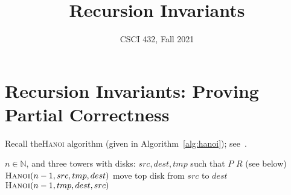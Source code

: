 \documentclass{article}
\title{Recursion Invariants}
\author{CSCI 432, Fall 2021}
\def\N{{\mathbb N}}
\newcommand{\algref}[1]{Algorithm~\ref{alg:#1}}
\begin{document}
\maketitle

\section*{Recursion Invariants: Proving Partial Correctness}

Recall the\textsc{Hanoi} algorithm (given in \algref{hanoi});
see~\cite[Ch.~1]{textbook}.

\begin{algorithm}[h!]
    \caption{$\textsc{Hanoi}(n,src,dest,tmp)$}\label{alg:hanoi}
    \begin{algorithmic}[1]
        \REQUIRE $n \in \N$, and three towers with disks: $src,dest,tmp$ such
        that $P$
        \ENSURE $R$ (see below)
        \label{algln:certificate:ifdirs}
            \STATE $\textsc{Hanoi}(n-1,src,tmp,dest)$
            \STATE move top disk from $src$ to $dest$
            \STATE $\textsc{Hanoi}(n-1,tmp,dest,src)$
        \ENDIF
    \end{algorithmic}
\end{algorithm}
\end{document}
